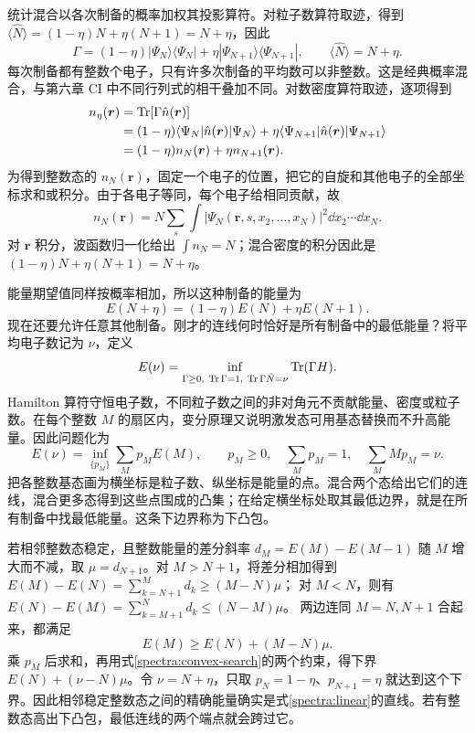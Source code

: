 统计混合以各次制备的概率加权其投影算符。对粒子数算符取迹，得到 $\langle\hat N\rangle=(1-\eta)N+\eta(N+1)=N+\eta$，因此
\begin{equation}
\Gamma=(1-\eta)|\Psi_N\rangle\langle\Psi_N|+
\eta|\Psi_{N+1}\rangle\langle\Psi_{N+1}|,
\qquad \langle\hat N\rangle=N+\eta.
\end{equation}
每次制备都有整数个电子，只有许多次制备的平均数可以非整数。这是经典概率混合，与第六章 CI 中不同行列式的相干叠加不同。对数密度算符取迹，逐项得到
\begin{align}
n_\eta(\bm r)&=\operatorname{Tr}[\Gamma\hat n(\bm r)]\notag\\
&=(1-\eta)\langle\Psi_N|\hat n(\bm r)|\Psi_N\rangle
+\eta\langle\Psi_{N+1}|\hat n(\bm r)|\Psi_{N+1}\rangle\notag\\
&=(1-\eta)n_N(\bm r)+\eta n_{N+1}(\bm r).
\end{align}
为得到整数态的 $n_N(\bm r)$，固定一个电子的位置，把它的自旋和其他电子的全部坐标求和或积分。由于各电子等同，每个电子给相同贡献，故
\begin{equation}
n_N(\bm r)=N\sum_s\int
|\Psi_N(\bm r,s,x_2,\ldots,x_N)|^2\dd x_2\cdots\dd x_N.
\end{equation}
对 $\bm r$ 积分，波函数归一化给出 $\int n_N=N$；混合密度的积分因此是 $(1-\eta)N+\eta(N+1)=N+\eta$。

能量期望值同样按概率相加，所以这种制备的能量为
\begin{equation}\label{spectra:linear}
E(N+\eta)=(1-\eta)E(N)+\eta E(N+1).
\end{equation}
现在还要允许任意其他制备。刚才的连线何时恰好是所有制备中的最低能量？将平均电子数记为 $\nu$，定义
\begin{equation}
E(\nu)=\inf_{\Gamma\ge0,\ \Tr\Gamma=1,\ \Tr\Gamma\hat N=\nu}\Tr(\Gamma H).
\end{equation}
Hamilton 算符守恒电子数，不同粒子数之间的非对角元不贡献能量、密度或粒子数。在每个整数 $M$ 的扇区内，变分原理又说明激发态可用基态替换而不升高能量。因此问题化为
\begin{equation}\label{spectra:convex-search}
E(\nu)=\inf_{\{p_M\}}\sum_M p_ME(M),\qquad
p_M\ge0,\quad\sum_Mp_M=1,\quad\sum_MMp_M=\nu.
\end{equation}
把各整数基态画为横坐标是粒子数、纵坐标是能量的点。混合两个态给出它们的连线，混合更多态得到这些点围成的凸集；在给定横坐标处取其最低边界，就是在所有制备中找最低能量。这条下边界称为下凸包。

若相邻整数态稳定，且整数能量的差分斜率 $d_M=E(M)-E(M-1)$ 随 $M$ 增大而不减，取 $\mu=d_{N+1}$。对 $M>N+1$，将差分相加得到
$E(M)-E(N)=\sum_{k=N+1}^M d_k\ge(M-N)\mu$；
对 $M<N$，则有
$E(N)-E(M)=\sum_{k=M+1}^N d_k\le(N-M)\mu$。
两边连同 $M=N,N+1$ 合起来，都满足
\begin{equation}
E(M)\ge E(N)+(M-N)\mu.
\end{equation}
乘 $p_M$ 后求和，再用式\eqref{spectra:convex-search}的两个约束，得下界 $E(N)+(\nu-N)\mu$。令 $\nu=N+\eta$，只取 $p_N=1-\eta$、$p_{N+1}=\eta$ 就达到这个下界。因此相邻稳定整数态之间的精确能量确实是式\eqref{spectra:linear}的直线。若有整数态高出下凸包，最低连线的两个端点就会跨过它。

